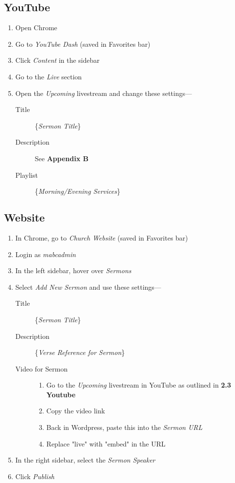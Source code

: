 \documentclass[12pt]{article}
\begin{document}
    \subsection{YouTube}
    \begin{enumerate}
        \item Open Chrome
        \item Go to \emph{YouTube Dash} (saved in Favorites bar)
        \item Click \emph{Content} in the sidebar
        \item Go to the \emph{Live} section
        \item Open the \emph{Upcoming} livestream and change these settings---
        \begin{description}
            \item [Title] \{\emph{Sermon Title}\}
                \item [Description] See \textbf{Appendix B}
            \item [Playlist] \{\emph{Morning/Evening Services}\}
        \end{description}
    \end{enumerate}

    \subsection{Website}
    \begin{enumerate}
        \item In Chrome, go to \emph{Church Website} (saved in Favorites bar)
        \item Login as \emph{mabcadmin}
        \item In the left sidebar, hover over \emph{Sermons}
        \item Select \emph{Add New Sermon} and use these settings---
        \begin{description}
            \item [Title] \{\emph{Sermon Title}\}
            \item [Description] \{\emph{Verse Reference for Sermon}\}
            \item [Video for Sermon] \hfill
            \begin{enumerate}
                \item Go to the \emph{Upcoming} livestream in YouTube as outlined in \textbf{2.3 Youtube}
                \item Copy the video link
                \item Back in Wordpress, paste this into the \emph{Sermon URL}
                \item Replace "live" with "embed" in the URL
            \end{enumerate}
        \end{description}
        \item In the right sidebar, select the \emph{Sermon Speaker}
        \item Click \emph{Publish}
    \end{enumerate}
\end{document}
